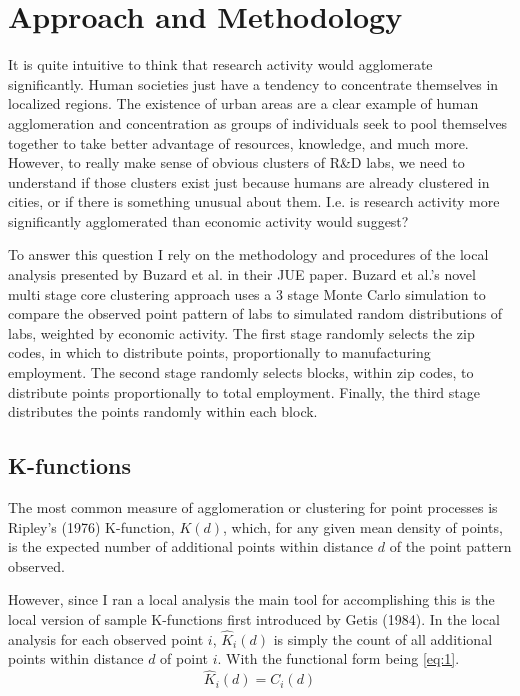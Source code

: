 \documentclass[12pt,letterpaper]{article}
\begin{document}
\section{Approach and Methodology}\label{sec:3}
It is quite intuitive to think that research activity would agglomerate significantly. Human societies just have a tendency to concentrate themselves in localized regions. The existence of urban areas are a clear example of human agglomeration and concentration as groups of individuals seek to pool themselves together to take better advantage of resources, knowledge, and much more. However, to really make sense of obvious clusters of R\&D labs, we need to understand if those clusters exist just because humans are already clustered in cities, or if there is something unusual about them. I.e. is research activity more significantly agglomerated than economic activity would suggest? 
\par
To answer this question I rely on the methodology and procedures of the local analysis presented by Buzard et al. in their JUE paper. Buzard et al.'s novel multi stage core clustering approach uses a 3 stage Monte Carlo simulation to compare the observed point pattern of labs to simulated random distributions of labs, weighted by economic activity. The first stage randomly selects the zip codes, in which to distribute points, proportionally to manufacturing employment. The second stage randomly selects blocks, within zip codes, to distribute points proportionally to total employment. Finally, the third stage distributes the points randomly within each block. 

\subsection{K-functions}
The most common measure of agglomeration or clustering for point processes is Ripley's (1976) K-function, \(K(d)\), which, for any given mean density of points, is the expected number of additional points within distance \(d\) of the point pattern observed.
\par
However, since I ran a local analysis the main tool for accomplishing this is the local version of sample K-functions first introduced by Getis (1984). In the local analysis for each observed point \(i\), \(\hat{K}_{i}(d)\) is simply the count of all additional points within distance \(d\) of point \(i\). With the functional form being \eqref{eq:1}. 
\begin{equation}\label{eq:1}
    \hat{K}_{i}(d) = C_{i}(d)
\end{equation}
\end{document}
